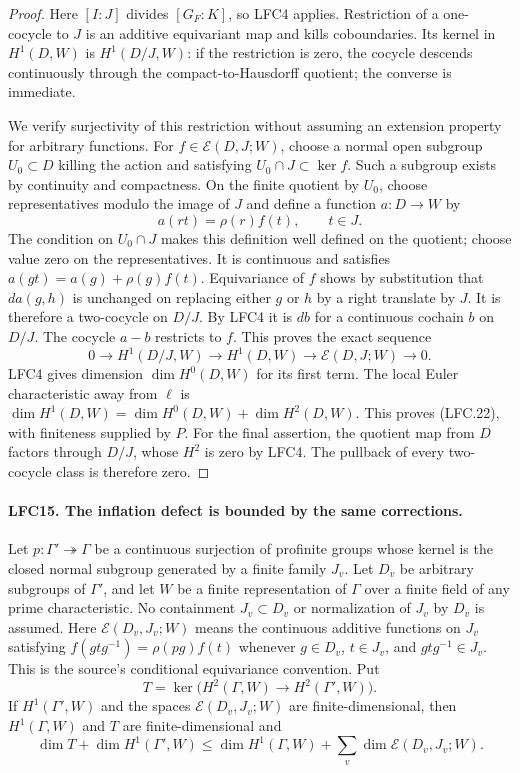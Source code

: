 \documentclass[11pt,a4paper]{article}
\numberwithin{equation}{section}
\theoremstyle{remark}\newtheorem{remark}[theorem]{Remark}
\begin{document}
\begin{proof}
Here \([I:J]\) divides \([G_F:K]\), so LFC4 applies.
Restriction of a one-cocycle to \(J\) is an additive
equivariant map and kills coboundaries.
Its kernel in \(H^1(D,W)\) is \(H^1(D/J,W)\):
if the restriction is zero, the cocycle descends
continuously through the compact-to-Hausdorff quotient;
the converse is immediate.

We verify surjectivity of this restriction without
assuming an extension property for arbitrary functions.
For \(f\in\mathcal E(D,J;W)\), choose a normal open
subgroup \(U_0\subset D\) killing the action and satisfying
\(U_0\cap J\subset\ker f\).  Such a subgroup exists
by continuity and compactness.  On the finite quotient
by \(U_0\), choose representatives modulo the image of \(J\)
and define a function \(a:D\to W\) by
\[
                 a(r t)=\rho(r)f(t),\qquad t\in J.
 \]
The condition on \(U_0\cap J\) makes this definition
well defined on the quotient; choose value zero on
the representatives.  It is continuous and satisfies
\(a(g t)=a(g)+\rho(g)f(t)\).
Equivariance of \(f\) shows by substitution that
\(d a(g,h)\) is unchanged on replacing either \(g\) or \(h\)
by a right translate by \(J\).  It is therefore a
two-cocycle on \(D/J\).
By LFC4 it is \(d b\) for a continuous cochain \(b\)
on \(D/J\).  The cocycle \(a-b\) restricts to \(f\).
This proves the exact sequence
\[
 0\longrightarrow H^1(D/J,W)\longrightarrow H^1(D,W)
       \longrightarrow\mathcal E(D,J;W)\longrightarrow0.
 \]
LFC4 gives dimension \(\dim H^0(D,W)\) for its first term.
The local Euler characteristic away from \(\ell\) is
\(\dim H^1(D,W)=\dim H^0(D,W)+\dim H^2(D,W)\).
This proves (LFC.22), with finiteness supplied by \(P\).
For the final assertion, the quotient map from \(D\)
factors through \(D/J\), whose \(H^2\) is zero by LFC4.
The pullback of every two-cocycle class is therefore zero.
\end{proof}

\paragraph{LFC15. The inflation defect is bounded by the same corrections.}
\label{claim:LFC15}
Let \(p:\Gamma'\twoheadrightarrow\Gamma\) be a continuous
surjection of profinite groups whose kernel is the closed
normal subgroup generated by a finite family \(J_v\).
Let \(D_v\) be arbitrary subgroups of \(\Gamma'\), and let
\(W\) be a finite representation of \(\Gamma\) over a finite
field of any prime characteristic.
No containment \(J_v\subset D_v\) or normalization of \(J_v\)
by \(D_v\) is assumed.  Here \(\mathcal E(D_v,J_v;W)\)
means the continuous additive functions on \(J_v\)
satisfying
\(f(g t g^{-1})=\rho(p g)f(t)\) whenever \(g\in D_v\),
\(t\in J_v\), and \(g t g^{-1}\in J_v\).
This is the source's conditional equivariance convention.
Put
\[
 T=\ker\bigl(H^2(\Gamma,W)\to H^2(\Gamma',W)\bigr).
 \]
If \(H^1(\Gamma',W)\) and the spaces
\(\mathcal E(D_v,J_v;W)\) are finite-dimensional, then
\(H^1(\Gamma,W)\) and \(T\) are finite-dimensional and
\[
 \dim T+\dim H^1(\Gamma',W)
   \le\dim H^1(\Gamma,W)+
                          \sum_v\dim\mathcal E(D_v,J_v;W).
                                                        \tag{LFC.23}
\]
\end{document}
